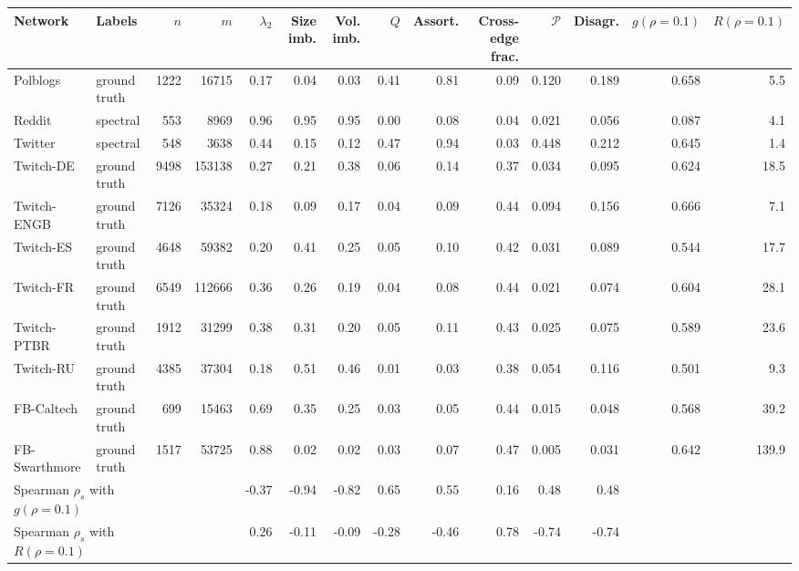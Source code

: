 \begin{tabular}{llrrrrrrrrrrrr}
\toprule
Network & Labels & $n$ & $m$ & $\lambda_2$ & Size imb. & Vol. imb. & $Q$ & Assort. & Cross-edge frac. & $\mathcal P$ & Disagr. & $g(\rho{=}0.1)$ & $R(\rho{=}0.1)$ \\
\midrule
Polblogs & ground truth & 1222 & 16715 & 0.17 & 0.04 & 0.03 & 0.41 & 0.81 & 0.09 & 0.120 & 0.189 & 0.658 & 5.5 \\
Reddit & spectral & 553 & 8969 & 0.96 & 0.95 & 0.95 & 0.00 & 0.08 & 0.04 & 0.021 & 0.056 & 0.087 & 4.1 \\
Twitter & spectral & 548 & 3638 & 0.44 & 0.15 & 0.12 & 0.47 & 0.94 & 0.03 & 0.448 & 0.212 & 0.645 & 1.4 \\
Twitch-DE & ground truth & 9498 & 153138 & 0.27 & 0.21 & 0.38 & 0.06 & 0.14 & 0.37 & 0.034 & 0.095 & 0.624 & 18.5 \\
Twitch-ENGB & ground truth & 7126 & 35324 & 0.18 & 0.09 & 0.17 & 0.04 & 0.09 & 0.44 & 0.094 & 0.156 & 0.666 & 7.1 \\
Twitch-ES & ground truth & 4648 & 59382 & 0.20 & 0.41 & 0.25 & 0.05 & 0.10 & 0.42 & 0.031 & 0.089 & 0.544 & 17.7 \\
Twitch-FR & ground truth & 6549 & 112666 & 0.36 & 0.26 & 0.19 & 0.04 & 0.08 & 0.44 & 0.021 & 0.074 & 0.604 & 28.1 \\
Twitch-PTBR & ground truth & 1912 & 31299 & 0.38 & 0.31 & 0.20 & 0.05 & 0.11 & 0.43 & 0.025 & 0.075 & 0.589 & 23.6 \\
Twitch-RU & ground truth & 4385 & 37304 & 0.18 & 0.51 & 0.46 & 0.01 & 0.03 & 0.38 & 0.054 & 0.116 & 0.501 & 9.3 \\
FB-Caltech & ground truth & 699 & 15463 & 0.69 & 0.35 & 0.25 & 0.03 & 0.05 & 0.44 & 0.015 & 0.048 & 0.568 & 39.2 \\
FB-Swarthmore & ground truth & 1517 & 53725 & 0.88 & 0.02 & 0.02 & 0.03 & 0.07 & 0.47 & 0.005 & 0.031 & 0.642 & 139.9 \\
\midrule
\multicolumn{2}{l}{Spearman $\rho_s$ with $g(\rho{=}0.1)$} &  &  & -0.37 & -0.94 & -0.82 & 0.65 & 0.55 & 0.16 & 0.48 & 0.48 &  &  \\
\multicolumn{2}{l}{Spearman $\rho_s$ with $R(\rho{=}0.1)$} &  &  & 0.26 & -0.11 & -0.09 & -0.28 & -0.46 & 0.78 & -0.74 & -0.74 &  &  \\
\bottomrule
\end{tabular}